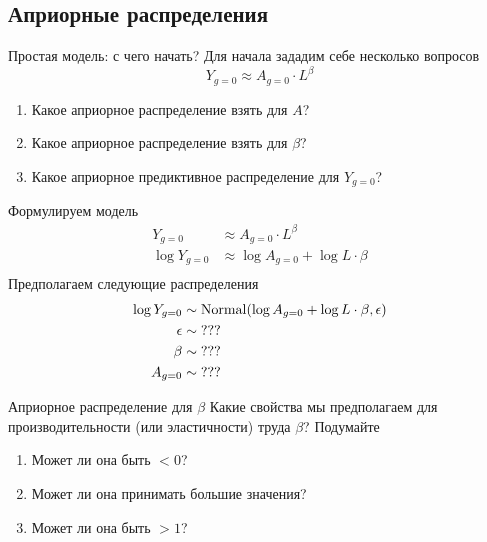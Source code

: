 \documentclass{beamer}
\begin{document}
\subsection{Априорные распределения}
\begin{frame}{Простая модель: с чего начать?}
    Для начала зададим себе несколько вопросов
    \begin{equation*}
    Y_{g=0} \approx A_{g=0} \cdot L ^ \beta
\end{equation*}
\begin{enumerate}
    \item Какое априорное распределение взять для $A$?
    \item Какое априорное распределение взять для $\beta$?
    \item Какое априорное предиктивное распределение для $Y_{g=0}$?
\end{enumerate}
\end{frame}
\begin{frame}{Формулируем модель}
    \begin{align*}
        Y_{g=0} &\approx A_{g=0} \cdot L ^ \beta\\
        \log Y_{g=0} &\approx \log A_{g=0} + \log L \cdot \beta\\
    \end{align*}
    Предполагаем следующие распределения
    \begin{align*}
        \log Y_{g=0} &\sim \operatorname{Normal}(\log A_{g=0} + \log L \cdot \beta, {\epsilon})\\
        {\epsilon} &\sim \text{???}\\
        \beta &\sim \text{???}\\
        A_{g=0} &\sim \text{???}\\
    \end{align*}
\end{frame}
\begin{frame}{Априорное распределение для $\beta$}
    Какие свойства мы предполагаем для производительности (или эластичности) труда $\beta$? Подумайте
    \begin{enumerate}
        \item Может ли она быть $<0$? 
        \item Может ли она принимать большие значения? \visible<3->{Нет}
        \item Может ли она быть $>1$? 
    \end{enumerate}
\end{frame}
\end{document}
